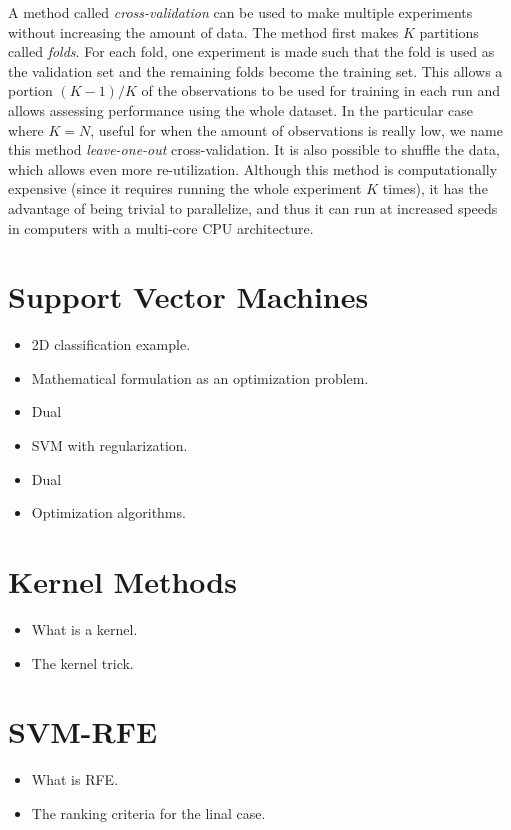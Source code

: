 A method called \emph{cross-validation} can be used to make mul\-ti\-ple experiments with\-out increasing the amount of data. The method first makes $K$ partitions called \emph{folds}. For each fold, one experiment is made such that the fold is used as the validation set and the remaining folds become the training set. This allows a portion $(K-1)/K$ of the observations to be used for training in each run and allows assessing performance using the whole dataset. In the particular case where $K = N$, useful for when the amount of observations is really low, we name this method \emph{leave-one-out} cross-validation. It is also possible to shuffle the data, which allows even more re-utilization. Although this method is computationally expensive (since it requires running the whole experiment $K$ times), it has the advantage of being trivial to parallelize, and thus it can run at increased speeds in computers with a multi-core CPU architecture. 

\section{Support Vector Machines}

\begin{itemize}
    \item 2D classification example.
    \item Mathematical formulation as an optimization problem.
    \item Dual
    \item SVM with regularization.
    \item Dual
    \item Optimization algorithms.
\end{itemize}

\section{Kernel Methods}

\begin{itemize}
    \item What is a kernel.
    \item The kernel trick.
\end{itemize}

\section{SVM-RFE}
\begin{itemize}
    \item What is RFE.
    \item The ranking criteria for the linal case.
\end{itemize}

